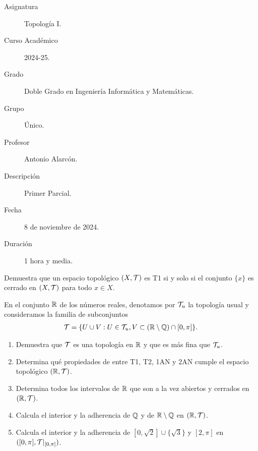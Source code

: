 \documentclass[12pt]{article}
\begin{document}

    
    

    \begin{description}
        \item[Asignatura] Topología I.
        \item[Curso Académico] 2024-25.
        \item[Grado] Doble Grado en Ingeniería Informática y Matemáticas.
        \item[Grupo] Único.
        \item[Profesor] Antonio Alarcón.
        \item[Descripción] Primer Parcial.
        \item[Fecha] 8 de noviembre de 2024.
        \item[Duración] 1 hora y media.
    
    \end{description}
    \newpage

    \begin{ejercicio}[2.5 puntos]
        Demuestra que un espacio topológico $(X, \mathcal{T})$ es T1 si y solo si el conjunto $\{x\}$ es cerrado en $(X, \mathcal{T})$ para todo $x \in X$.
    \end{ejercicio}
    
    \begin{ejercicio}[7.5 puntos]
        En el conjunto $\mathbb{R}$ de los números reales, denotamos por $\mathcal{T}_u$ la topología usual y consideramos la familia de subconjuntos
        \begin{gather*}
            \mathcal{T}=\{U\cup V : U \in \mathcal{T}_u, V \subset (\mathbb{R}\setminus \mathbb{Q})\cap [0,\pi]\}.
        \end{gather*}
        \begin{enumerate}
            \item Demuestra que $\mathcal{T}$ es una topología en $\mathbb{R}$ y que es más fina que $\mathcal{T}_u$.
            \item Determina qué propiedades de entre T1, T2, 1AN y 2AN cumple el espacio topológico $(\mathbb{R}, \mathcal{T})$.
            \item Determina todos los intervalos de $\mathbb{R}$ que son a la vez abiertos y cerrados en $(\mathbb{R}, \mathcal{T})$.
            \item Calcula el interior y la adherencia de $\mathbb{Q}$ y de $\mathbb{R}\setminus \mathbb{Q}$ en $(\mathbb{R}, \mathcal{T})$.
            \item Calcula el interior y la adherencia de $[0,\sqrt{2}]\cup \{\sqrt{3}\}$ y $[2,\pi]$ en $([0,\pi], \mathcal{T}|_{[0,\pi]})$.
        \end{enumerate} 
    \end{ejercicio}
\end{document}
